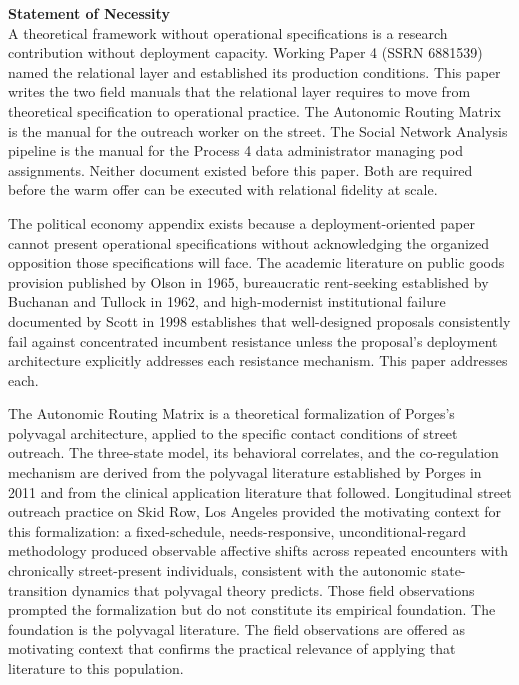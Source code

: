 \documentclass[12pt, letterpaper]{article}
\begin{document}
\newpage

\vspace{8pt}
\noindent\textbf{Statement of Necessity}\\[1pt]
A theoretical framework without operational specifications is a research contribution without deployment capacity. Working Paper 4 (SSRN 6881539) named the relational layer and established its production conditions. This paper writes the two field manuals that the relational layer requires to move from theoretical specification to operational practice. The Autonomic Routing Matrix is the manual for the outreach worker on the street. The Social Network Analysis pipeline is the manual for the Process 4 data administrator managing pod assignments. Neither document existed before this paper. Both are required before the warm offer can be executed with relational fidelity at scale.

The political economy appendix exists because a deployment-oriented paper cannot present operational specifications without acknowledging the organized opposition those specifications will face. The academic literature on public goods provision published by Olson in 1965, bureaucratic rent-seeking established by Buchanan and Tullock in 1962, and high-modernist institutional failure documented by Scott in 1998 establishes that well-designed proposals consistently fail against concentrated incumbent resistance unless the proposal's deployment architecture explicitly addresses each resistance mechanism. This paper addresses each.

The Autonomic Routing Matrix is a theoretical formalization of Porges's polyvagal architecture, applied to the specific contact conditions of street outreach. The three-state model, its behavioral correlates, and the co-regulation mechanism are derived from the polyvagal literature established by Porges in 2011 and from the clinical application literature that followed. Longitudinal street outreach practice on Skid Row, Los Angeles provided the motivating context for this formalization: a fixed-schedule, needs-responsive, unconditional-regard methodology produced observable affective shifts across repeated encounters with chronically street-present individuals, consistent with the autonomic state-transition dynamics that polyvagal theory predicts. Those field observations prompted the formalization but do not constitute its empirical foundation. The foundation is the polyvagal literature. The field observations are offered as motivating context that confirms the practical relevance of applying that literature to this population.
\end{document}
